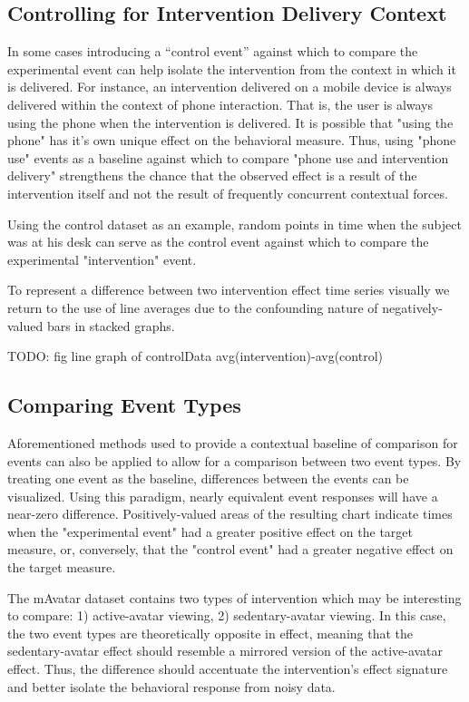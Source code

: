 \subsection{Controlling for Intervention Delivery Context}
In some cases introducing a “control event” against which to compare the experimental event can help isolate the intervention from the context in which it is delivered.
For instance, an intervention delivered on a mobile device is always delivered within the context of phone interaction.
That is, the user is always using the phone when the intervention is delivered.
It is possible that "using the phone" has it's own unique effect on the behavioral measure.
Thus, using "phone use" events as a baseline against which to compare "phone use and intervention delivery" strengthens the chance that the observed effect is a result of the intervention itself and not the result of frequently concurrent contextual forces.

Using the control dataset as an example, random points in time when the subject was at his desk can serve as the control event against which to compare the experimental "intervention" event.

To represent a difference between two intervention effect time series visually we return to the use of line averages due to the confounding nature of negatively-valued bars in stacked graphs.

TODO: fig line graph of controlData avg(intervention)-avg(control)


\subsection{Comparing Event Types}
Aforementioned methods used to provide a contextual baseline of comparison for events can also be applied to allow for a comparison between two event types.
By treating one event as the baseline, differences between the events can be visualized.
Using this paradigm, nearly equivalent event responses will have a near-zero difference.
Positively-valued areas of the resulting chart indicate times when the "experimental event" had a greater positive effect on the target measure, or, conversely, that the "control event" had a greater negative effect on the target measure.


The mAvatar dataset contains two types of intervention which may be interesting to compare: 1) active-avatar viewing, 2) sedentary-avatar viewing.
In this case, the two event types are theoretically opposite in effect, meaning that the sedentary-avatar effect should resemble a mirrored version of the active-avatar effect.
Thus, the difference should accentuate the intervention's effect signature and better isolate the behavioral response from noisy data.

